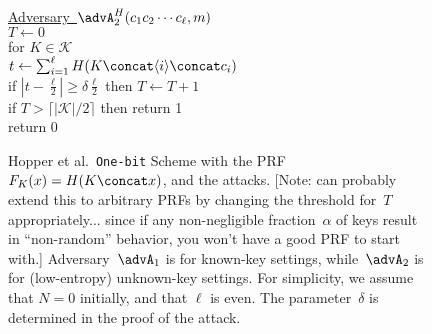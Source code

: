 \begin{figure}[tph]
\begin{center}
{\medskip
\underline{Adversary~$\advA_2^H(c_1 c_2 \cdots c_\ell, m)$}\\[2pt]
$T\gets 0$\\
for $K \in \mathcal{K}$\\
\nudge $t \gets \sum_{i=1}^{\ell} H(K \concat \langle i \rangle \concat c_i)$\\
\nudge if $\left| t - \frac{\ell}{2} \right| \geq \delta\frac{\ell}{2}$ 
 then $T \gets T+1$\\
if $T > \lceil |\mathcal{K}|/2 \rceil$ then return 1\\
return 0
}
\caption{Hopper et al.\ \texttt{One-bit} Scheme with the PRF
  $F_K(x)=H(K \concat x)$, and the attacks.  [Note: can probably
  extend this to arbitrary PRFs by changing the threshold for~$T$
  appropriately... since if any non-negligible fraction~$\alpha$ of keys result
  in ``non-random'' behavior, you won't have a good PRF to start
  with.]  Adversary~$\advA_1$ is for known-key settings,
  while~$\advA_2$ is for (low-entropy) unknown-key settings.  For
  simplicity, we assume that $N=0$ initially, and that $\ell$ is
  even.  The parameter~$\delta$ is determined in the proof of the
  attack.}
\label{fig:one-bit}
\end{center}
\end{figure}

